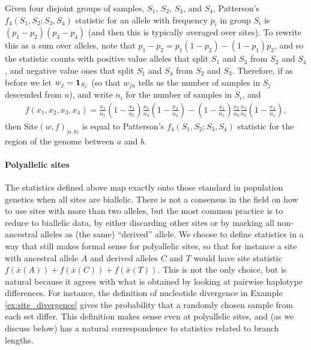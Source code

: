 \documentclass{article}
\newcommand{\site}{\mbox{Site}} %
\newcommand{\iw}{w} %
\newcommand{\aw}{{\bar x}} %
\begin{document}
\begin{example}[Patterson's $f_4$] \label{ex:site_f4}
    Given four disjoint groups of samples, $S_1$, $S_2$, $S_3$, and $S_4$,
    Patterson's $f_4(S_1, S_2; S_3, S_4)$ statistic for an allele with frequency $p_i$ in group $S_i$
    is $(p_1 - p_2)(p_3 - p_4)$ (and then this is typically averaged over sites).
    To rewrite this as a sum over alleles, note that
    $p_1 - p_2 = p_1 (1 - p_2) - (1 - p_1) p_2$,
    and so the statistic counts with positive value
    alleles that split $S_1$ and $S_3$ from $S_2$ and $S_4$,
    and negative value ones that split $S_1$ and $S_4$ from $S_2$ and $S_3$.
    Therefore, if as before we
    let $\iw_j = \bone_{S_j}$
    (so that $\iw_{ju}$ tells us the number of samples in $S_j$ descended from $u$),
    and write $n_i$ for the number of samples in $S_i$, and
    \begin{align*}
        f(x_1, x_2, x_3, x_4)
        =
        \frac{x_1}{n_1}
        \left(1 - \frac{x_2}{n_2}\right)
        \frac{x_3}{n_3}
        \left(1 - \frac{x_4}{n_4}\right)
        -
        \left(1 - \frac{x_1}{n_1}\right)
        \frac{x_2}{n_2}
        \frac{x_3}{n_3}
        \left(1 - \frac{x_4}{n_4}\right),
    \end{align*}
    then $\site(\iw, f)_{[a,b)}$ is equal to Patterson's $f_4(S_1, S_2; S_3, S_4)$ statistic
    for the region of the genome between $a$ and $b$.
\end{example}


\paragraph{Polyallelic sites}
The statistics defined above map exactly onto those standard in population genetics
when all sites are biallelic.
There is not a consensus in the field
on how to use sites with more than two alleles, but the most common practice is
to reduce to biallelic data, by either discarding other sites
or by marking all non-ancestral alleles as (the same) ``derived'' allele.
We choose to define statistics in a way that still makes formal sense for polyallelic sites,
so that for instance a site with ancestral allele $A$ and derived alleles $C$ and $T$
would have site statistic $f(\aw(A)) + f(\aw(C)) + f(\aw(T))$.
This is not the only choice, but is natural because it agrees with what is obtained by
looking at pairwise haplotype differences.
For instance, the definition of nucleotide divergence in Example \ref{ex:site_divergence}
gives the probability that a randomly chosen sample from each set differ.
This definition makes sense even at polyallelic sites,
and (as we discuss below) has a natural correspondence to statistics related to branch lengths.
\end{document}
